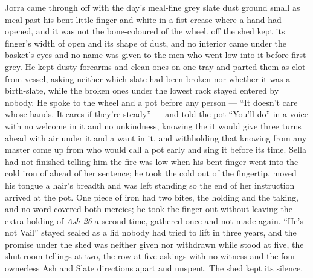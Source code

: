 Jorra came through  off  with the day's meal-fine grey slate dust ground small as meal past his bent little finger and white in a fist-crease where a hand had opened, and it was not the bone-coloured  of the wheel.  off the shed kept its finger's width of open and its shape of dust, and no interior came under the basket's eyes and no name was given to the men who went low into it before first grey. He kept dusty forearms and clean ones on one tray and parted them as clot from vessel, asking neither which slate had been broken nor whether it was a birth-slate, while the broken ones under the lowest rack stayed entered by nobody. He spoke to the wheel and a pot before any person --- “It doesn't care whose hands. It cares if they're steady” --- and told the pot “You'll do” in a voice with no welcome in it and no unkindness, knowing the  it would give three turns ahead with air under it and a want in it, and withholding that knowing from any master come up from  who would call a pot early and sing it before its time. Sella had not finished telling him the fire was low when his bent finger went into the cold iron of  ahead of her sentence; he took the cold out of the fingertip, moved his tongue a hair's breadth and was left standing so the end of her instruction arrived at the pot. One piece of iron had two bites, the holding and the taking, and no  word covered both mercies; he took the finger out without leaving the extra holding of \emph{Ash 26} a second time, gathered once and not made again. “He's not Vail” stayed sealed as a lid nobody had tried to lift in three years, and the promise under the shed was neither given nor withdrawn while  stood at five, the shut-room tellings at two, the row at five askings with no witness and the four ownerless Ash and Slate directions apart and unspent. The shed kept its silence.

